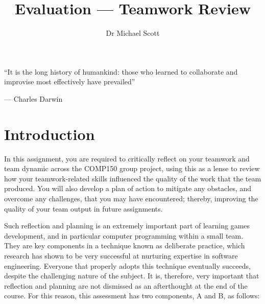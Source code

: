 \documentclass{../fal_assignment}
\title{Evaluation --- Teamwork Review}
\author{Dr Michael Scott}
\begin{document}
\maketitle
\begin{marginquote}
    ``It is the long history of humankind: those who learned to collaborate and improvise most effectively have prevailed''
    
    --- Charles Darwin
\end{marginquote}
\section*{Introduction}

In this assignment, you are required to critically reflect on your teamwork and team dynamic across the COMP150 group project, using this as a lense to review how your teamwork-related skills influenced the quality of the work that the team produced. You will also develop a plan of action to mitigate any obstacles, and overcome any challenges, that you may have encountered; thereby, improving the quality of your team output in future assignments.

Such reflection and planning is an extremely important part of learning games development, and in particular computer programming within a small team. They are key components in a technique known as deliberate practice, which research has shown to be very successful at nurturing expertise in software engineering. Everyone that properly adopts this technique eventually succeeds, despite the challenging nature of the subject. It is, therefore, very important that reflection and planning are not dismissed as an afterthought at the end of the course. For this reason, this assessment has two components, A and B, as follows:
\end{document}
